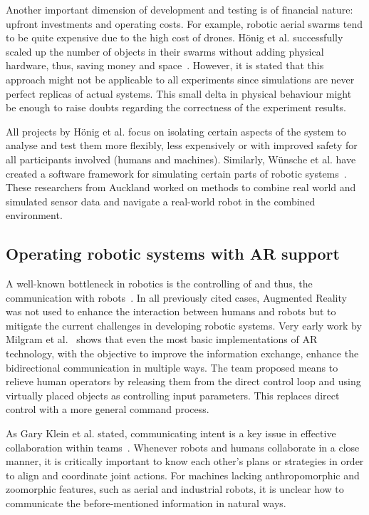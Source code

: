 Another important dimension of development and testing is of financial nature: upfront investments and operating costs. For example, robotic aerial swarms tend to be quite expensive due to the high cost of drones. Hönig et al. successfully scaled up the number of objects in their swarms without adding physical hardware, thus, saving money and space~\cite{hoenig2015mixed}. However, it is stated that this approach might not be applicable to all experiments since simulations are never perfect replicas of actual systems. This small delta in physical behaviour might be enough to raise doubts regarding the correctness of the experiment results.

All projects by Hönig et al. focus on isolating certain aspects of the system to analyse and test them
more flexibly, less expensively or with improved safety for all participants involved (humans and
machines). Similarly, Wünsche et al. have created a software framework for simulating certain parts
of robotic systems~\cite{chen2009mixed}. These researchers from Auckland worked on methods to combine real world
and simulated sensor data and navigate a real-world robot in the combined environment.

\subsection{Operating robotic systems with AR support}
A well-known bottleneck in robotics is the controlling of and thus, the communication with robots~\cite{RoboticsScienceMag}. In all previously cited cases, Augmented Reality was not used to enhance the interaction between humans and robots but to mitigate the current challenges in developing robotic systems. Very early work by Milgram et al.~\cite{milgram1993applications} shows that even the most basic implementations of AR technology, with the objective to improve the information exchange, enhance the bidirectional communication in multiple ways. The team proposed means to relieve human operators by releasing them from the direct control loop and using virtually placed objects as controlling input parameters. This replaces direct control with a more general command process.

As Gary Klein et al. stated, communicating intent is a key issue in effective collaboration within teams~\cite{klein2005common}. Whenever robots and humans collaborate in a close manner, it is critically important to know each other’s plans or strategies in order to align and coordinate joint actions. For machines lacking anthropomorphic and zoomorphic features, such as aerial and industrial robots, it is unclear how to communicate the before-mentioned information in natural ways.

